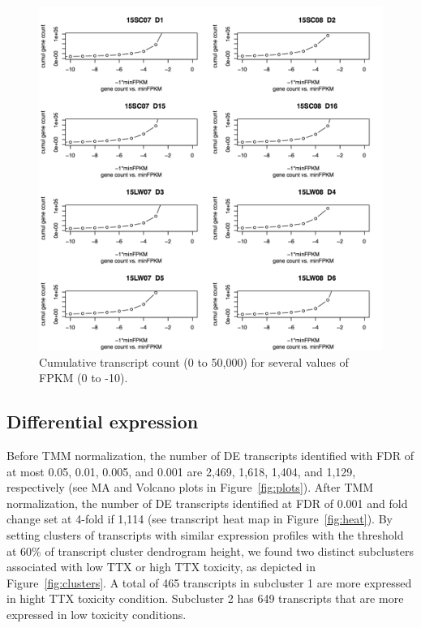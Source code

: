 \begin{figure}
    \centering
    \includegraphics[width=\textwidth]{figs/fpkm.png}
    \caption{Cumulative transcript count (0 to 50,000) for several values of FPKM (0 to -10).}
    \label{fig:fpkm}
\end{figure}

\subsection{Differential expression}

Before TMM normalization, the number of DE transcripts identified with FDR of at most 0.05, 0.01, 0.005, and 0.001 are 2,469, 1,618, 1,404, and 1,129, respectively (see MA and Volcano plots in Figure~\ref{fig:plots}). After TMM normalization, the number of DE transcripts identified at FDR of 0.001 and fold change set at 4-fold if 1,114 (see transcript heat map in Figure~\ref{fig:heat}). By setting clusters of transcripts with similar expression profiles with the threshold at 60\% of transcript cluster dendrogram height, we found two distinct subclusters associated with low TTX or high TTX toxicity, as depicted in Figure~\ref{fig:clusters}. A total of 465 transcripts in subcluster 1 are more expressed in hight TTX toxicity condition. Subcluster 2 has 649 transcripts that are more expressed in low toxicity conditions.

